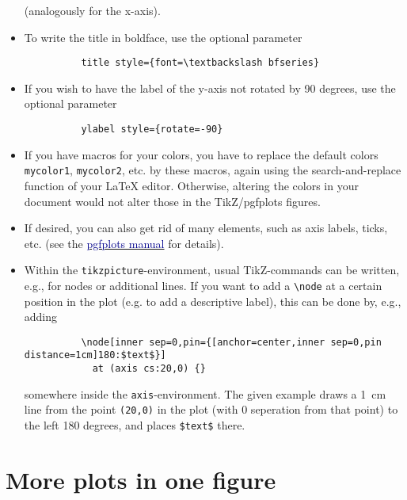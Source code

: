\documentclass{article}
\newcommand{\linkto}[2]{\href{#1}{\textcolor{darkblue}{#2}}}
\begin{document}
\begin{itemize}[itemsep=0pt]
		(analogously for the x-axis).
	\item To write the title in boldface, use the optional parameter
		\begin{verbatim}
		  title style={font=\textbackslash bfseries}
		\end{verbatim}
	\item If you wish to have the label of the y-axis not rotated by 90 degrees, use the optional parameter
		\begin{verbatim}
		  ylabel style={rotate=-90}
		\end{verbatim}
	\item If you have macros for your colors, you have to replace the default colors \verb|mycolor1|, \verb|mycolor2|, etc. by these macros, again using the search-and-replace function of your LaTeX editor. Otherwise, altering the colors in your document would not alter those in the TikZ/pgfplots figures.
	\item If desired, you can also get rid of many elements, such as axis labels, ticks, etc. (see the \linkto{https://ftp.agdsn.de/pub/mirrors/latex/dante/graphics/pgf/contrib/pgfplots/doc/pgfplots.pdf}{pgfplots manual} for details).
	\item Within the \verb|tikzpicture|-environment, usual TikZ-commands can be written, e.g., for nodes or additional lines. If you want to add a \verb|\node| at a certain position in the plot (e.g. to add a descriptive label), this can be done by, e.g., adding
		\begin{verbatim}
		  \node[inner sep=0,pin={[anchor=center,inner sep=0,pin distance=1cm]180:$text$}]
		    at (axis cs:20,0) {}
		\end{verbatim}
	somewhere inside the \verb|axis|-environment.
	The given example draws a \SI{1}{\centi\meter} line from the point \verb|(20,0)| in the plot (with 0 seperation from that point) to the left 180 degrees, and places \verb|$text$| there.
\end{itemize}


\section{More plots in one figure}
\label{sec:groupplots}
\end{document}
